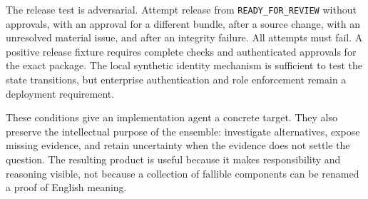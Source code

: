 The release test is adversarial. Attempt release from
\texttt{READY\_FOR\_REVIEW} without approvals, with an approval for a different
bundle, after a source change, with an unresolved material issue, and after an
integrity failure. All attempts must fail. A positive release fixture requires
complete checks and authenticated approvals for the exact package. The local
synthetic identity mechanism is sufficient to test the state transitions, but
enterprise authentication and role enforcement remain a deployment requirement.

These conditions give an implementation agent a concrete target. They also
preserve the intellectual purpose of the ensemble: investigate alternatives,
expose missing evidence, and retain uncertainty when the evidence does not settle
the question. The resulting product is useful because it makes responsibility
and reasoning visible, not because a collection of fallible components can be
renamed a proof of English meaning.
